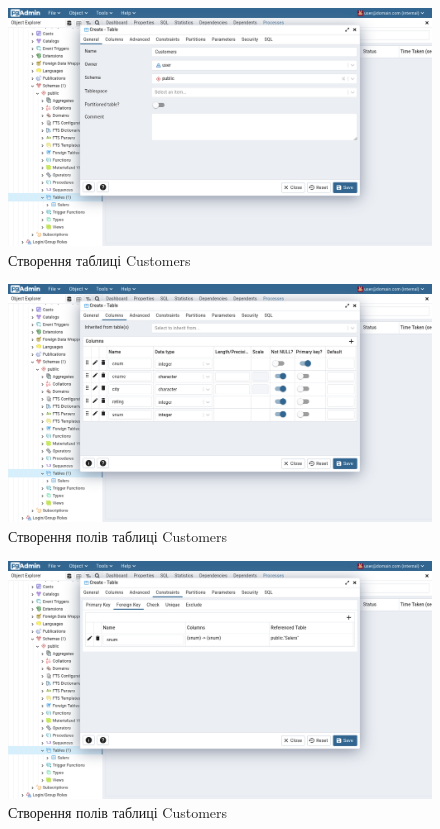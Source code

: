 \documentclass[14pt]{extreport}
\begin{document}
\begin{normalsize}
	\begin{figure}[H]
		\centering
		\includegraphics[scale=0.35]{10}
		\caption{Створення таблиці Customers}
	\end{figure}
	
	\begin{figure}[H]
		\centering
		\includegraphics[scale=0.35]{11}
		\caption{Створення полів таблиці Customers}
	\end{figure}
	
	\begin{figure}[H]
		\centering
		\includegraphics[scale=0.35]{12}
		\caption{Створення полів таблиці Customers}
	\end{figure}
	

\end{normalsize}
\end{document}
